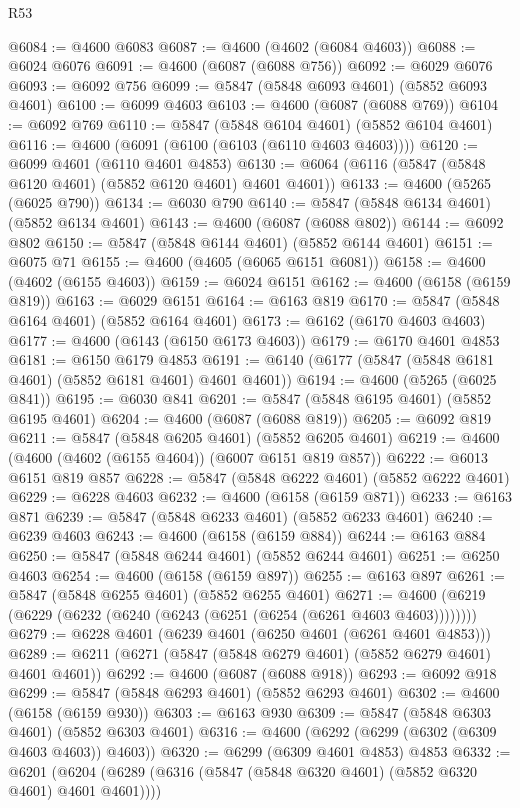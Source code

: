 \begin{lexlean}{R53}
\begin{coremodule}
@6084 := @4600 @6083
@6087 := @4600 (@4602 (@6084 @4603))
@6088 := @6024 @6076
@6091 := @4600 (@6087 (@6088 @756))
@6092 := @6029 @6076
@6093 := @6092 @756
@6099 := @5847 (@5848 @6093 @4601) (@5852 @6093 @4601)
@6100 := @6099 @4603
@6103 := @4600 (@6087 (@6088 @769))
@6104 := @6092 @769
@6110 := @5847 (@5848 @6104 @4601) (@5852 @6104 @4601)
@6116 := @4600 (@6091 (@6100 (@6103 (@6110 @4603 @4603))))
@6120 := @6099 @4601 (@6110 @4601 @4853)
@6130 := @6064 (@6116 (@5847 (@5848 @6120 @4601) (@5852 @6120 @4601) @4601 @4601))
@6133 := @4600 (@5265 (@6025 @790))
@6134 := @6030 @790
@6140 := @5847 (@5848 @6134 @4601) (@5852 @6134 @4601)
@6143 := @4600 (@6087 (@6088 @802))
@6144 := @6092 @802
@6150 := @5847 (@5848 @6144 @4601) (@5852 @6144 @4601)
@6151 := @6075 @71
@6155 := @4600 (@4605 (@6065 @6151 @6081))
@6158 := @4600 (@4602 (@6155 @4603))
@6159 := @6024 @6151
@6162 := @4600 (@6158 (@6159 @819))
@6163 := @6029 @6151
@6164 := @6163 @819
@6170 := @5847 (@5848 @6164 @4601) (@5852 @6164 @4601)
@6173 := @6162 (@6170 @4603 @4603)
@6177 := @4600 (@6143 (@6150 @6173 @4603))
@6179 := @6170 @4601 @4853
@6181 := @6150 @6179 @4853
@6191 := @6140 (@6177 (@5847 (@5848 @6181 @4601) (@5852 @6181 @4601) @4601 @4601))
@6194 := @4600 (@5265 (@6025 @841))
@6195 := @6030 @841
@6201 := @5847 (@5848 @6195 @4601) (@5852 @6195 @4601)
@6204 := @4600 (@6087 (@6088 @819))
@6205 := @6092 @819
@6211 := @5847 (@5848 @6205 @4601) (@5852 @6205 @4601)
@6219 := @4600 (@4600 (@4602 (@6155 @4604)) (@6007 @6151 @819 @857))
@6222 := @6013 @6151 @819 @857
@6228 := @5847 (@5848 @6222 @4601) (@5852 @6222 @4601)
@6229 := @6228 @4603
@6232 := @4600 (@6158 (@6159 @871))
@6233 := @6163 @871
@6239 := @5847 (@5848 @6233 @4601) (@5852 @6233 @4601)
@6240 := @6239 @4603
@6243 := @4600 (@6158 (@6159 @884))
@6244 := @6163 @884
@6250 := @5847 (@5848 @6244 @4601) (@5852 @6244 @4601)
@6251 := @6250 @4603
@6254 := @4600 (@6158 (@6159 @897))
@6255 := @6163 @897
@6261 := @5847 (@5848 @6255 @4601) (@5852 @6255 @4601)
@6271 := @4600 (@6219 (@6229 (@6232 (@6240 (@6243 (@6251 (@6254 (@6261 @4603 @4603))))))))
@6279 := @6228 @4601 (@6239 @4601 (@6250 @4601 (@6261 @4601 @4853)))
@6289 := @6211 (@6271 (@5847 (@5848 @6279 @4601) (@5852 @6279 @4601) @4601 @4601))
@6292 := @4600 (@6087 (@6088 @918))
@6293 := @6092 @918
@6299 := @5847 (@5848 @6293 @4601) (@5852 @6293 @4601)
@6302 := @4600 (@6158 (@6159 @930))
@6303 := @6163 @930
@6309 := @5847 (@5848 @6303 @4601) (@5852 @6303 @4601)
@6316 := @4600 (@6292 (@6299 (@6302 (@6309 @4603 @4603)) @4603))
@6320 := @6299 (@6309 @4601 @4853) @4853
@6332 := @6201 (@6204 (@6289 (@6316 (@5847 (@5848 @6320 @4601) (@5852 @6320 @4601) @4601 @4601))))

\end{coremodule}
\end{lexlean}
